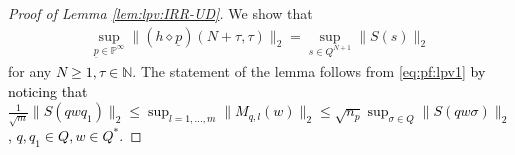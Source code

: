 \documentclass[journal,twoside,web]{ieeecolor}
\begin{document}
  \begin{proof}[Proof of Lemma \ref{lem:lpv:IRR-UD}]
   We show that 
      \begin{equation}
      \label{eq:pf:lpv1}
      \begin{split}
          \sup_{\underline{p} \in \mathbb{P}^{\infty}}\!\! %
          \|(h \diamond \underline{p})(N+\tau,\tau)\|_2
          \!\! = \!\! 
          \sup_{s \in Q^{N+1}}  \|S(s)\|_2 
      \end{split}
      \end{equation}
   for any \textcolor{black}{$N \ge 1,\tau \in \mathbb{N}$}.  %
      The statement of the lemma follows from \eqref{eq:pf:lpv1}
      \textcolor{black}{by noticing that 
       $\frac{1}{\sqrt{m}} \|S(qwq_1)\|_2  \le \sup_{l=1,\ldots,m} \|M_{q,l}(w)\|_2 \le \sqrt{n_p} \sup_{\sigma  \in Q} \|S(q w\sigma)\|_2$, $q,q_1 \in Q,w \in Q^{*}$.}

\end{proof}
\end{document}
